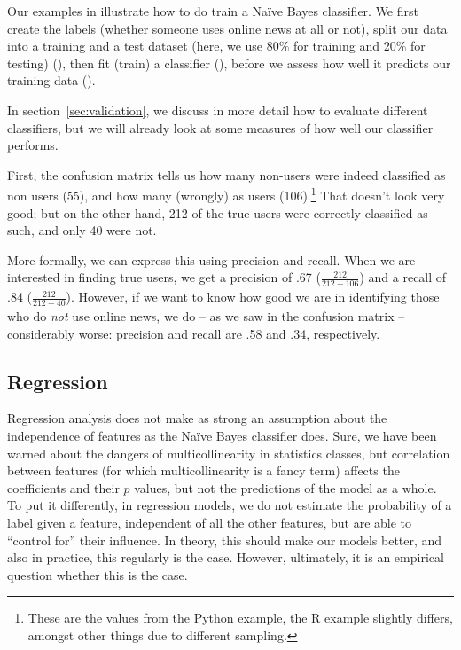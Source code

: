 Our examples in  illustrate how to do train a Na\"ive Bayes classifier.
We first create the labels (whether someone uses online news at all or
not), split our data into a training and a test dataset (here, we use
80\% for training and 20\% for testing) (), then
fit (train) a classifier (), before we assess how well it
predicts our training data ().

In section~\ref{sec:validation}, we discuss in more detail how to
evaluate different classifiers, but we will already look at some
measures of how well our classifier performs.

First, the confusion matrix tells us how many non-users were indeed
classified as non users (55), and how many (wrongly) as users
(106).\footnote{These are the values from the Python example, the R
  example slightly differs, amongst other things due to different
  sampling.} That doesn't look very good; but on the other hand, 212
of the true users were correctly classified as such, and only 40 were
not.

More formally, we can express this using precision and recall. When we
are interested in finding true users, we get a precision of .67
($\frac{212}{212+106}$) and a recall of .84 ($\frac{212}{212+40}$).
However, if we want to know how good we are in identifying those who
do \emph{not} use online news, we do -- as we saw in the confusion
matrix -- considerably worse: precision and recall are .58 and .34,
respectively.



\subsection{Regression}
\label{subsec:regression}

Regression analysis does not make as strong an assumption about the
independence of features as the Na\"ive Bayes classifier does.  Sure,
we have been warned about the dangers of multicollinearity in
statistics classes, but correlation between features (for which
multicollinearity is a fancy term) affects the coefficients and their
$p$ values, but not the predictions of the model as a whole.  To put
it differently, in regression models, we do not estimate the
probability of a label given a feature, independent of all the other
features, but are able to ``control for'' their influence.  In theory,
this should make our models better, and also in practice, this
regularly is the case. However, ultimately, it is an empirical
question whether this is the case.

